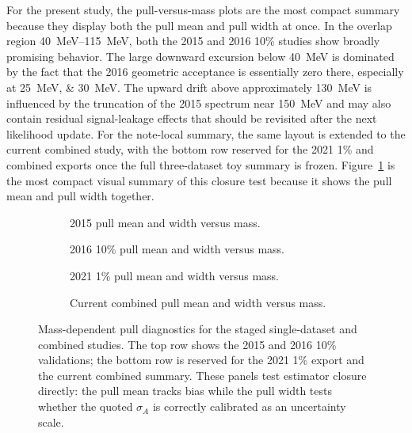 For the present study, the pull-versus-mass plots are the most compact summary because
they display both the pull mean and pull width at once. In the overlap region
\SIrange{40}{115}{MeV}, both the 2015 and 2016 10\% studies show broadly promising
behavior. The large downward excursion below \SI{40}{MeV} is dominated by the fact that
the 2016 geometric acceptance is essentially zero there, especially at
\SIlist{25;30}{MeV}. The upward drift above approximately \SI{130}{MeV} is influenced by
the truncation of the 2015 spectrum near \SI{150}{MeV} and may also contain residual
signal-leakage effects that should be revisited after the next likelihood update. For
the note-local summary, the same layout is extended to the current combined study, with
the bottom row reserved for the 2021 1\% and combined exports once the full
three-dataset toy summary is frozen. Figure~\ref{fig:pull-vs-mass} is the most compact
visual summary of this closure test because it shows the pull mean and pull width
together.

\begin{figure}[p]
\centering
\begin{subfigure}[t]{0.48\linewidth}
  \centering
  \caption{2015 pull mean and width versus mass.}
\end{subfigure}
\hfill
\begin{subfigure}[t]{0.48\linewidth}
  \centering
  \caption{2016 10\% pull mean and width versus mass.}
\end{subfigure}
\vspace{0.8em}

\begin{subfigure}[t]{0.48\linewidth}
  \centering
  \caption{2021 1\% pull mean and width versus mass.}
\end{subfigure}
\hfill
\begin{subfigure}[t]{0.48\linewidth}
  \centering
  \caption{Current combined pull mean and width versus mass.}
\end{subfigure}
\caption{Mass-dependent pull diagnostics for the staged single-dataset and combined
studies. The top row shows the 2015 and 2016 10\% validations; the bottom row is
reserved for the 2021 1\% export and the current combined summary. These panels test
estimator closure directly: the pull mean tracks bias while the pull width tests
whether the quoted $\sigma_A$ is correctly calibrated as an uncertainty scale.}
\label{fig:pull-vs-mass}
\end{figure}

